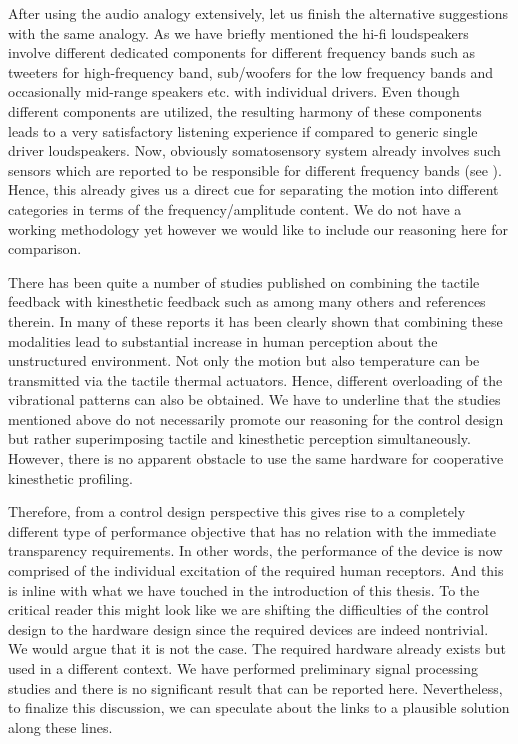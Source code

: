 After using the audio analogy extensively, let us finish the alternative suggestions with the same analogy. As we have briefly mentioned
the hi-fi loudspeakers involve different dedicated components for different frequency bands such as tweeters for high-frequency band,
sub/woofers for the low frequency bands and occasionally mid-range speakers etc. with individual drivers. Even though different components are 
utilized, the resulting harmony of these components leads to a very satisfactory listening experience if compared to generic single driver
loudspeakers. Now, obviously somatosensory system already involves such sensors which are reported to be responsible for different 
frequency bands (see ). Hence, this already gives us a direct cue for separating the motion into different categories 
in terms of the frequency/amplitude content. We do not have a working methodology yet however we would like to include our reasoning here
for comparison. 



There has been quite a number of studies published on combining the tactile feedback with kinesthetic feedback such as \cite{kammermeier,
kimcolgate,kyung,pacchierotti,meli} among many others and references therein. In many of these reports it has been clearly shown that 
combining these modalities lead to substantial increase in human perception about the unstructured environment. Not only the motion but 
also temperature can be transmitted via the tactile thermal actuators. Hence, different overloading of the vibrational patterns can also 
be obtained. We have to underline that the studies mentioned above do not necessarily promote our reasoning for the control design but 
rather superimposing tactile and kinesthetic perception simultaneously. However, there is no apparent obstacle to use the same hardware 
for cooperative kinesthetic profiling. 



Therefore, from a control design perspective this gives rise to a completely different type of performance objective that has no relation 
with the immediate transparency requirements. In other words, the performance of the device is now comprised of the individual excitation 
of the required human receptors. And this is inline with what we have touched in the introduction of this thesis. To the critical reader
this might look like we are shifting the difficulties of the control design to the hardware design since the required devices are indeed
nontrivial. We would argue that it is not the case. The required hardware already exists but used in a different context. We have performed 
preliminary signal processing studies and there is no significant result that can be reported here. Nevertheless, to finalize this discussion,
we can speculate about the links to a plausible solution along these lines.


